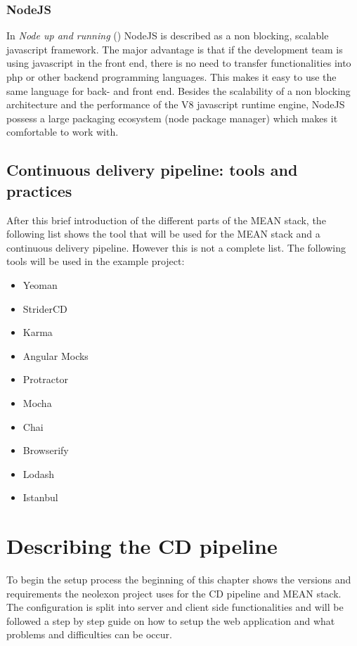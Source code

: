 \subsubsection{NodeJS}
In \textit{Node up and running} (\cite{hughes2012node}) NodeJS is described as a non blocking, scalable javascript framework. The major advantage is that
if the development team is using javascript in the front end, there is no need to transfer functionalities into php or other backend programming languages.
This makes it easy to use the same language for back- and front end. Besides the scalability of a non blocking architecture and the performance
of the V8 javascript runtime engine, NodeJS possess a large packaging ecosystem (node package manager) which makes it comfortable to work with.

\subsection{Continuous delivery pipeline: tools and practices}
After this brief introduction of the different parts of the MEAN stack, the following list shows the tool that will be used for the MEAN stack and a
continuous delivery pipeline. However this is not a complete list. The following tools will be used in the example project:

\begin{itemize}
  \item Yeoman
  \item StriderCD
  \item Karma
  \item Angular Mocks
  \item Protractor
  \item Mocha
  \item Chai
  \item Browserify
  \item Lodash
  \item Istanbul
\end{itemize}

\section{Describing the CD pipeline}
\label{section:Describing CD Pipeline (WIP)}
To begin the setup process the beginning of this chapter shows the versions and requirements the neolexon project uses for the CD pipeline and MEAN stack.
The configuration is split into server and client side functionalities and will be followed a step by step guide on how to setup the web application
and what problems and difficulties can be occur.

